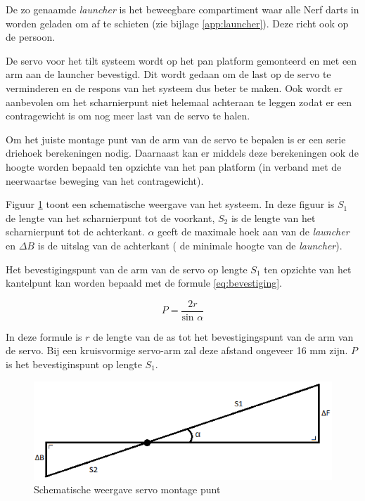 De zo genaamde \emph{launcher} is het beweegbare compartiment waar alle
Nerf darts in worden geladen om af te schieten (zie bijlage \ref{app:launcher}).
Deze richt ook op de persoon.

De servo voor het tilt systeem wordt op het pan platform gemonteerd en met een
arm aan de launcher bevestigd. Dit wordt gedaan om de last op de servo te
verminderen en de respons van het systeem dus beter te maken. Ook wordt er
aanbevolen om het scharnierpunt niet helemaal achteraan te leggen zodat er een
contragewicht is om nog meer last van de servo te halen.

Om het juiste montage punt van de arm van de servo te bepalen is er een serie
driehoek berekeningen nodig. Daarnaast kan er middels deze berekeningen ook de
hoogte worden bepaald ten opzichte van het pan platform (in verband met de
neerwaartse beweging van het contragewicht).

Figuur \ref{fig:servo-montage} toont een schematische weergave van het systeem.
In deze figuur is $S_1$ de lengte van het scharnierpunt tot de voorkant, $S_2$
is de lengte van het scharnierpunt tot de achterkant. $\alpha$ geeft de maximale
hoek aan van de \emph{launcher} en $\Delta{B}$ is de uitslag van de achterkant (
de minimale hoogte van de \emph{launcher}).

Het bevestigingspunt van de arm van de servo op lengte $S_1$ ten opzichte van het
kantelpunt kan worden bepaald met de formule \ref{eq:bevestiging}.

\begin{equation}
    P = \frac{2r}{\text{sin } \alpha}
    \label{eq:bevestiging}
\end{equation}

In deze formule is $r$ de lengte van de as tot het bevestigingspunt van de arm
van de servo. Bij een kruisvormige servo-arm zal deze afstand ongeveer 16 \unit{mm}
zijn. $P$ is het bevestiginspunt op lengte $S_1$.

\begin{figure}
    \includegraphics{figures/servo-montage.png}
    \caption{Schematische weergave servo montage punt}
    \label{fig:servo-montage}
\end{figure}

